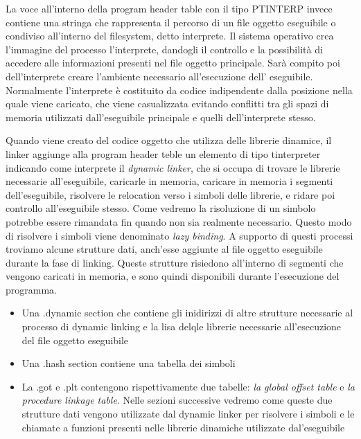 La voce all'interno della program header table con il tipo PTINTERP
invece contiene una stringa che rappresenta il percorso di un file
oggetto eseguibile o condiviso all'interno del filesystem, detto
interprete. Il sistema operativo crea l'immagine del processo
l'interprete, dandogli il controllo e la possibilità di accedere alle
informazioni presenti nel file oggetto principale. Sarà compito poi
dell'interprete creare l'ambiente necessario all'esecuzione dell'
eseguibile. Normalmente l'interprete è costituito da codice
indipendente dalla posizione nella quale viene caricato, che viene
casualizzata evitando conflitti tra gli spazi di memoria utilizzati
dall'eseguibile principale e quelli dell'interprete stesso.

Quando viene creato del codice oggetto che utilizza delle librerie
dinamice, il linker aggiunge alla program header teble un elemento di
tipo tinterpreter indicando come interprete il \emph{dynamic
  linker}, che si occupa di trovare le librerie necessarie
all'eseguibile, caricarle in memoria, caricare in memoria i segmenti
dell'eseguibile, risolvere le relocation verso i simboli delle
librerie, e ridare poi controllo all'eseguibile stesso. Come vedremo
la risoluzione di un simbolo potrebbe essere rimandata fin quando non
sia realmente necessario. Questo modo di risolvere i simboli viene
denominato \emph{lazy binding}. A supporto di questi processi troviamo
alcune strutture dati, anch'esse aggiunte al file oggetto eseguibile
durante la fase di linking. Queste strutture risiedono all'interno di
segmenti che vengono caricati in memoria, e sono quindi disponibili
durante l'esecuzione del programma.

\begin{itemize}

  \item Una .dynamic section che contiene gli inidirizzi di altre
    strutture necessarie al processo di dynamic linking e la lisa delqle librerie
    necessarie all'esecuzione del file oggetto eseguibile

  \item Una .hash section contiene una tabella dei simboli

  \item La .got e .plt contengono rispettivamente due tabelle:
    \emph{la global offset table} e \emph{la procedure linkage
      table}. Nelle sezioni successive vedremo come queste due
    strutture dati vengono utilizzate dal dynamic linker per risolvere
    i simboli e le chiamate a funzioni presenti nelle librerie
    dinamiche utilizzate dal'eseguibile
\end{itemize}

